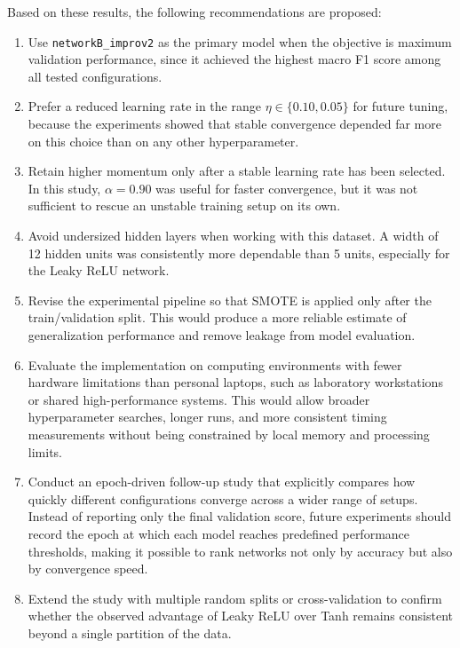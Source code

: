 \documentclass{acm_proc_article-sp}
\begin{document}
Based on these results, the following recommendations are proposed:

\begin{enumerate}
  \item Use \texttt{networkB\_improv2} as the primary model when the
        objective is maximum validation performance, since it achieved
        the highest macro F1 score among all tested configurations.

  \item Prefer a reduced learning rate in the range
        $\eta \in \{0.10, 0.05\}$ for future tuning, because the
        experiments showed that stable convergence depended far more on
        this choice than on any other hyperparameter.

  \item Retain higher momentum only after a stable learning rate has
        been selected.  In this study, $\alpha=0.90$ was useful for
        faster convergence, but it was not sufficient to rescue an
        unstable training setup on its own.

  \item Avoid undersized hidden layers when working with this dataset.
        A width of 12 hidden units was consistently more dependable than
        5 units, especially for the Leaky ReLU network.

  \item Revise the experimental pipeline so that SMOTE is applied only
        after the train/validation split.  This would produce a more
        reliable estimate of generalization performance and remove
        leakage from model evaluation.

  \item Evaluate the implementation on computing environments with fewer
        hardware limitations than personal laptops, such as laboratory
        workstations or shared high-performance systems.  This would
        allow broader hyperparameter searches, longer runs, and more
        consistent timing measurements without being constrained by
        local memory and processing limits.

  \item Conduct an epoch-driven follow-up study that explicitly compares
        how quickly different configurations converge across a wider
        range of setups.  Instead of reporting only the final validation
        score, future experiments should record the epoch at which each
        model reaches predefined performance thresholds, making it
        possible to rank networks not only by accuracy but also by
        convergence speed.

  \item Extend the study with multiple random splits or cross-validation
        to confirm whether the observed advantage of Leaky ReLU over
        Tanh remains consistent beyond a single partition of the data.
\end{enumerate}
\end{document}
